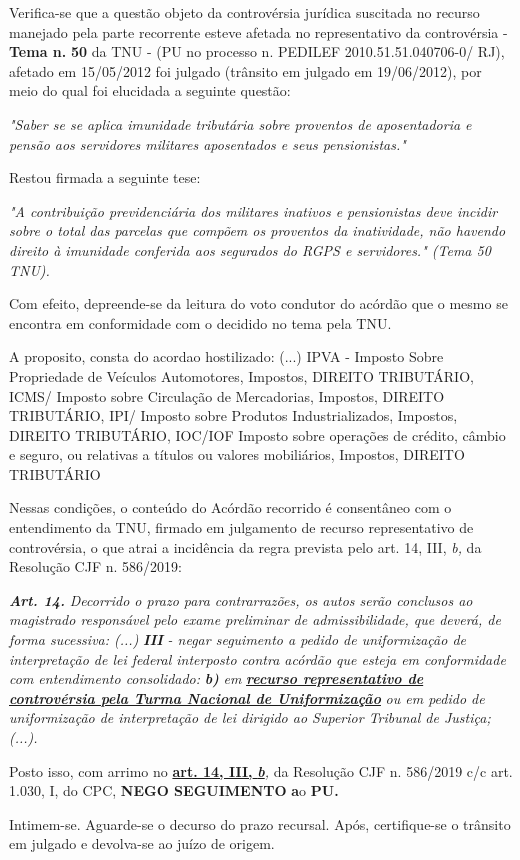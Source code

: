 \documentclass[12pt]{article}
\begin{document}
\justifying
\noindent Verifica-se que a questão objeto da controvérsia jurídica suscitada no recurso manejado pela parte recorrente esteve afetada no representativo da controvérsia - \textbf{Tema n. }\textbf{50} da TNU - (PU no processo n. PEDILEF 2010.51.51.040706-0/ RJ),  afetado em 15/05/2012 foi julgado (trânsito em julgado em 19/06/2012), por meio do qual foi elucidada a seguinte questão:

\noindent \textit{"Saber se se aplica imunidade tributária sobre proventos de aposentadoria e pensão aos servidores militares aposentados e seus pensionistas."}

\noindent Restou firmada a seguinte tese:

\noindent \textit{"A contribuição previdenciária dos militares inativos e pensionistas deve incidir sobre o total das parcelas que compõem os proventos da inatividade, não havendo direito à imunidade conferida aos segurados do RGPS e servidores." (Tema 50 TNU).}

\noindent Com efeito, depreende-se da leitura do voto condutor do acórdão que o mesmo se encontra em conformidade com o decidido no  tema pela TNU.

\noindent A proposito, consta do acordao hostilizado: (...) IPVA - Imposto Sobre Propriedade de Veículos Automotores, Impostos, DIREITO TRIBUTÁRIO, ICMS/ Imposto sobre Circulação de Mercadorias, Impostos, DIREITO TRIBUTÁRIO, IPI/ Imposto sobre Produtos Industrializados, Impostos, DIREITO TRIBUTÁRIO, IOC/IOF Imposto sobre operações de crédito, câmbio e seguro, ou relativas a títulos ou valores mobiliários, Impostos, DIREITO TRIBUTÁRIO

\noindent Nessas condições, o conteúdo do Acórdão recorrido é consentâneo com o entendimento da TNU, firmado em julgamento de recurso representativo de controvérsia, o que atrai a incidência da regra prevista pelo art. 14, III, \textit{b,} da Resolução CJF n. 586/2019:

\noindent \textit{\textbf{Art. 14.}}\textit{ Decorrido o prazo para contrarrazões, os autos serão conclusos ao magistrado responsável pelo exame preliminar de admissibilidade, que deverá, de forma sucessiva: (...) }\textit{\textbf{III }}\textit{- negar seguimento a pedido de uniformização de interpretação de lei federal interposto contra acórdão que esteja em conformidade com entendimento consolidado: }\textit{\textbf{b)}}\textit{ em }\uline{\textit{\textbf{recurso representativo de controvérsia pela Turma Nacional de Uniformização}}}\textit{ ou em pedido de uniformização de interpretação de lei dirigido ao Superior Tribunal de Justiça;(...).}

\noindent Posto isso, com arrimo no \uline{\textbf{art. 14, III, }}\uline{\textit{\textbf{b}}}\textit{,} da Resolução CJF n. 586/2019 c/c art. 1.030, I, do CPC, \textbf{NEGO SEGUIMENTO }\textbf{a}o\textbf{ PU}\textbf{.}

\noindent Intimem-se. Aguarde-se o decurso do prazo recursal. Após, certifique-se o trânsito em julgado e devolva-se ao juízo de origem.
\end{document}
